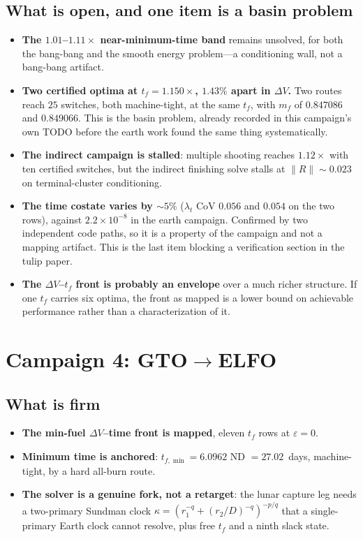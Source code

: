 \documentclass[11pt]{article}
\newcommand{\mf}{m_f}
\newcommand{\dV}{\Delta V}
\begin{document}
\subsection{What is open, and one item is a basin problem}

\begin{itemize}
  \item \textbf{The $1.01$--$1.11\times$ near-minimum-time band} remains
  unsolved, for both the bang-bang and the smooth energy problem---a
  conditioning wall, not a bang-bang artifact.
  \item \textbf{Two certified optima at $t_f = 1.150\times$, $1.43\%$ apart in
  $\dV$.} Two routes reach $25$ switches, both machine-tight, at the same
  $t_f$, with $\mf$ of $0.847086$ and $0.849066$. This is the basin problem,
  already recorded in this campaign's own TODO before the earth work found the
  same thing systematically.
  \item \textbf{The indirect campaign is stalled}: multiple shooting reaches
  $1.12\times$ with ten certified switches, but the indirect finishing solve
  stalls at $\|R\|\sim0.023$ on terminal-cluster conditioning.
  \item \textbf{The time costate varies by $\sim\!5\%$} ($\lambda_t$ CoV
  $0.056$ and $0.054$ on the two rows), against $2.2\times10^{-8}$ in the earth
  campaign. Confirmed by two independent code paths, so it is a property of the
  campaign and not a mapping artifact. This is the last item blocking a
  verification section in the tulip paper.
  \item \textbf{The $\dV$--$t_f$ front is probably an envelope} over a much
  richer structure. If one $t_f$ carries six optima, the front as mapped is a
  lower bound on achievable performance rather than a characterization of it.
\end{itemize}

\section{Campaign 4: GTO$\to$ELFO}

\subsection{What is firm}

\begin{itemize}
  \item \textbf{The min-fuel $\dV$--time front is mapped}, eleven $t_f$ rows at
  $\varepsilon = 0$.
  \item \textbf{Minimum time is anchored}: $t_{f,\min} = 6.0962$ ND
  $= 27.02$~days, machine-tight, by a hard all-burn route.
  \item \textbf{The solver is a genuine fork, not a retarget}: the lunar
  capture leg needs a two-primary Sundman clock
  $\kappa = (r_1^{-q} + (r_2/D)^{-q})^{-p/q}$ that a single-primary
  Earth clock cannot resolve, plus free $t_f$ and a ninth slack state.
\end{itemize}
\end{document}
